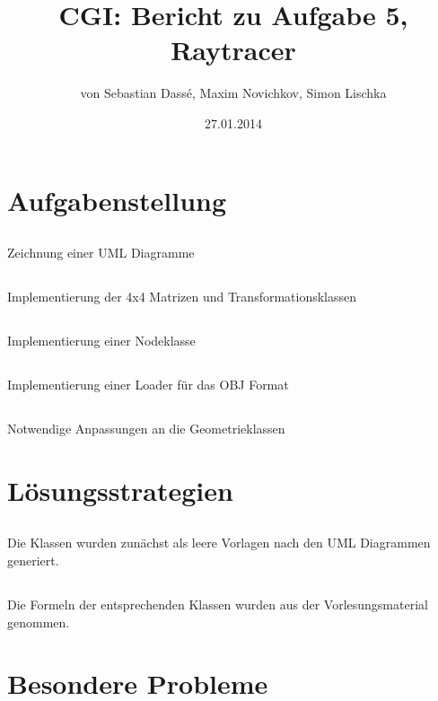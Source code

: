 \documentclass[11pt]{amsart}
\title{CGI: Bericht zu Aufgabe 5, Raytracer}
\author{von Sebastian Dass\'{e}, Maxim Novichkov, Simon Lischka }
\date{27.01.2014}
\begin{document}
\maketitle

\section{Aufgabenstellung}

\subsection{}
Zeichnung einer UML Diagramme

\subsection{}
Implementierung der 4x4 Matrizen und Transformationsklassen

\subsection{}
Implementierung einer Nodeklasse

\subsection{}
Implementierung einer Loader f\"ur das OBJ Format

\subsection{}
Notwendige Anpassungen an die Geometrieklassen

\section{L\"osungsstrategien}
\subsection{}
Die Klassen wurden zun\"achst als leere Vorlagen nach den UML Diagrammen generiert.

\subsection{}
Die Formeln der entsprechenden Klassen wurden aus der Vorlesungsmaterial genommen.

\section{Besondere Probleme}
\end{document}
